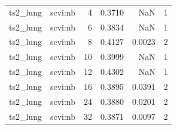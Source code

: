 \begin{tabular}{llrrrr}
ts2\_lung & scvi:nb & 4 & 0.3710 & NaN & 1 \\
ts2\_lung & scvi:nb & 6 & 0.3834 & NaN & 1 \\
ts2\_lung & scvi:nb & 8 & 0.4127 & 0.0023 & 2 \\
ts2\_lung & scvi:nb & 10 & 0.3999 & NaN & 1 \\
ts2\_lung & scvi:nb & 12 & 0.4302 & NaN & 1 \\
ts2\_lung & scvi:nb & 16 & 0.3895 & 0.0391 & 2 \\
ts2\_lung & scvi:nb & 24 & 0.3880 & 0.0201 & 2 \\
ts2\_lung & scvi:nb & 32 & 0.3871 & 0.0097 & 2 \\
\bottomrule
\end{tabular}
